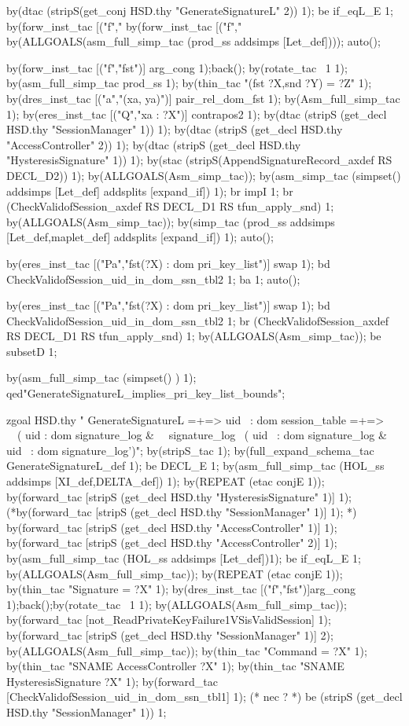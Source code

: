 \documentclass[a4paper,pdftex]{article}
\newenvironment{holz-proof}{\comment}{\endcomment}
\begin{document}
\begin{holz-proof}
by(dtac (stripS(get_conj HSD.thy "GenerateSignatureL" 2)) 1);
be if_eqL_E 1;
by(forw_inst_tac [("f","%
by(forw_inst_tac [("f","%
by(ALLGOALS(asm_full_simp_tac (prod_ss addsimps [Let_def])));
auto();

by(forw_inst_tac [("f","fst")] arg_cong 1);back();
by(rotate_tac ~1 1);
by(asm_full_simp_tac prod_ss 1);
by(thin_tac "(fst ?X,snd ?Y) = ?Z" 1);
by(dres_inst_tac [("a","(xa, ya)")] pair_rel_dom_fst 1);
by(Asm_full_simp_tac 1);
by(eres_inst_tac [("Q","xa : ?X")] contrapos2 1);
by(dtac (stripS (get_decl HSD.thy "SessionManager" 1)) 1);
by(dtac (stripS (get_decl HSD.thy "AccessController" 2)) 1);
by(dtac (stripS (get_decl HSD.thy "HysteresisSignature" 1)) 1);
by(stac (stripS(AppendSignatureRecord_axdef RS DECL_D2)) 1);
by(ALLGOALS(Asm_simp_tac));
by(asm_simp_tac (simpset() addsimps [Let_def] addsplits [expand_if]) 1);
br impI 1;
br (CheckValidofSession_axdef RS DECL_D1 RS tfun_apply_snd) 1;
by(ALLGOALS(Asm_simp_tac));
by(simp_tac (prod_ss addsimps [Let_def,maplet_def] addsplits [expand_if]) 1);
auto();

by(eres_inst_tac [("Pa","fst(?X) : dom pri_key_list")] swap 1);
bd CheckValidofSession_uid_in_dom_ssn_tbl2 1; ba 1; 
auto();

by(eres_inst_tac [("Pa","fst(?X) : dom pri_key_list")] swap 1);
bd CheckValidofSession_uid_in_dom_ssn_tbl2 1; 
br (CheckValidofSession_axdef RS DECL_D1 RS tfun_apply_snd) 1;
by(ALLGOALS(Asm_simp_tac));
be subsetD 1;

by(asm_full_simp_tac (simpset() ) 1);
qed"GenerateSignatureL_implies_pri_key_list_bounds";


zgoal HSD.thy 
" GenerateSignatureL =+=> uid ~: dom session_table =+=>             \
\ ( uid : dom signature_log &                                       \
\   signature_log %
\ ( uid ~: dom signature_log & uid ~: dom signature_log')";
by(stripS_tac 1);
by(full_expand_schema_tac GenerateSignatureL_def 1);
be DECL_E 1;
by(asm_full_simp_tac (HOL_ss addsimps [XI_def,DELTA_def]) 1); 
by(REPEAT (etac conjE 1));
by(forward_tac [stripS (get_decl HSD.thy "HysteresisSignature" 1)] 1);
(*by(forward_tac [stripS (get_decl HSD.thy "SessionManager" 1)] 1); *)
by(forward_tac [stripS (get_decl HSD.thy "AccessController" 1)] 1);
by(forward_tac [stripS (get_decl HSD.thy "AccessController" 2)] 1);
by(asm_full_simp_tac (HOL_ss addsimps [Let_def])1);
be if_eqL_E 1;
by(ALLGOALS(Asm_full_simp_tac));
by(REPEAT (etac conjE 1));
by(thin_tac "Signature = ?X" 1);
by(dres_inst_tac [("f","fst")]arg_cong 1);back();by(rotate_tac ~1 1);
by(ALLGOALS(Asm_full_simp_tac));
by(forward_tac [not_ReadPrivateKeyFailure1VSisValidSession] 1);
by(forward_tac [stripS (get_decl HSD.thy "SessionManager" 1)] 2);
by(ALLGOALS(Asm_full_simp_tac));
by(thin_tac "Command = ?X" 1);
by(thin_tac "SNAME AccessController ?X" 1);
by(thin_tac "SNAME HysteresisSignature ?X" 1);
by(forward_tac [CheckValidofSession_uid_in_dom_ssn_tbl1] 1); (* nec ? *)
be (stripS (get_decl HSD.thy "SessionManager" 1)) 1;


\end{holz-proof}
\end{document}
